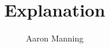 \documentclass[a4paper]{article}
\title{Explanation}
\author{Aaron Manning}
\date{}
\begin{document}
\maketitle

    \maketitle

    \allowdisplaybreaks

    \raggedright


    
\end{document}
